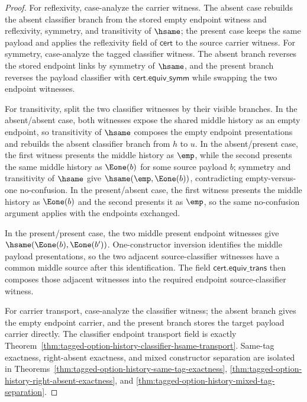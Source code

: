 \begin{proof}
For reflexivity, case-analyze the carrier witness. The absent case rebuilds the absent classifier branch from the stored empty endpoint witness and reflexivity, symmetry, and transitivity of $\hsame$; the present case keeps the same payload and applies the reflexivity field of $\mathsf{cert}$ to the source carrier witness. For symmetry, case-analyze the tagged classifier witness. The absent branch reverses the stored endpoint links by symmetry of $\hsame$, and the present branch reverses the payload classifier with $\mathsf{cert.equiv\_symm}$ while swapping the two endpoint witnesses.

For transitivity, split the two classifier witnesses by their visible branches. In the absent/absent case, both witnesses expose the shared middle history as an empty endpoint, so transitivity of $\hsame$ composes the empty endpoint presentations and rebuilds the absent classifier branch from $h$ to $u$. In the absent/present case, the first witness presents the middle history as $\emp$, while the second presents the same middle history as $\Eone(b)$ for some source payload $b$; symmetry and transitivity of $\hsame$ give $\hsame(\emp,\Eone(b))$, contradicting empty-versus-one no-confusion. In the present/absent case, the first witness presents the middle history as $\Eone(b)$ and the second presents it as $\emp$, so the same no-confusion argument applies with the endpoints exchanged.

In the present/present case, the two middle present endpoint witnesses give $\hsame(\Eone(b),\Eone(b'))$. One-constructor inversion identifies the middle payload presentations, so the two adjacent source-classifier witnesses have a common middle source after this identification. The field $\mathsf{cert.equiv\_trans}$ then composes those adjacent witnesses into the required endpoint source-classifier witness.

For carrier transport, case-analyze the classifier witness; the absent branch gives the empty endpoint carrier, and the present branch stores the target payload carrier directly. The classifier endpoint transport field is exactly Theorem~\ref{thm:tagged-option-history-classifier-hsame-transport}. Same-tag exactness, right-absent exactness, and mixed constructor separation are isolated in Theorems~\ref{thm:tagged-option-history-same-tag-exactness}, \ref{thm:tagged-option-history-right-absent-exactness}, and \ref{thm:tagged-option-history-mixed-tag-separation}.
\end{proof}


